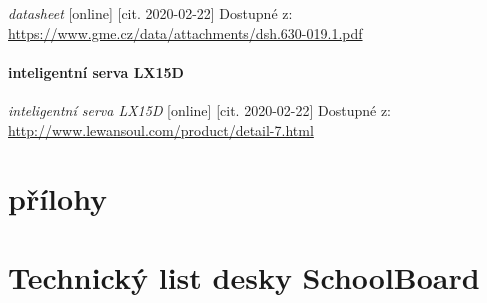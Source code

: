 \documentclass{template/socthesis}
\begin{document}
\begin{thebibliography}{1}
	\textit{datasheet} [online] [cit. 2020-02-22] Dostupné z:
	\url{https://www.gme.cz/data/attachments/dsh.630-019.1.pdf}
	
	\subsection{inteligentní serva LX15D}
	
	\textit{inteligentní serva LX15D} [online] [cit. 2020-02-22] Dostupné z:
	\url{http://www.lewansoul.com/product/detail-7.html}
	
\end{thebibliography}

\part{přílohy}
\part*{Technický list desky SchoolBoard}
\end{document}
